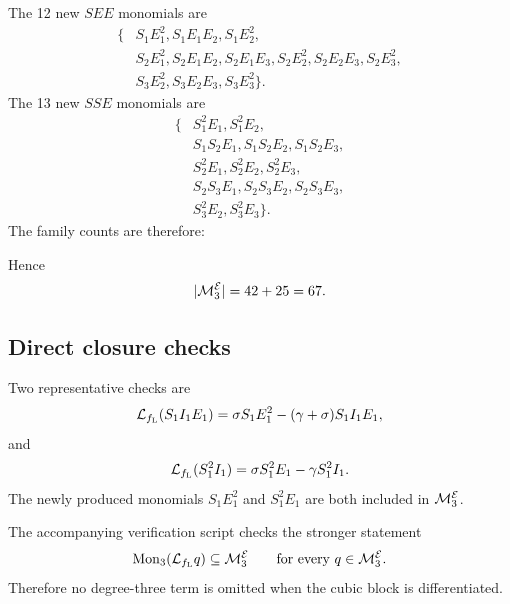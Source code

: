 The 12 new $SEE$ monomials are
\[
\begin{aligned}
\{&S_1E_1^2,S_1E_1E_2,S_1E_2^2,\\
  &S_2E_1^2,S_2E_1E_2,S_2E_1E_3,
   S_2E_2^2,S_2E_2E_3,S_2E_3^2,\\
  &S_3E_2^2,S_3E_2E_3,S_3E_3^2\}.
\end{aligned}
\]
The 13 new $SSE$ monomials are
\[
\begin{aligned}
\{&S_1^2E_1,S_1^2E_2,\\
  &S_1S_2E_1,S_1S_2E_2,S_1S_2E_3,\\
  &S_2^2E_1,S_2^2E_2,S_2^2E_3,\\
  &S_2S_3E_1,S_2S_3E_2,S_2S_3E_3,\\
  &S_3^2E_2,S_3^2E_3\}.
\end{aligned}
\]
The family counts are therefore:



Hence
\[
|\mathcal M_3^{\mathcal{E}}|
=
42+25
=
67.
\]

\subsection{Direct closure checks}

Two representative checks are
\[
\mathcal{L}_{f_{\mathrm L}}(S_1I_1E_1)
=
\sigma S_1E_1^2-(\gamma+\sigma)S_1I_1E_1,
\]
and
\[
\mathcal{L}_{f_{\mathrm L}}(S_1^2I_1)
=
\sigma S_1^2E_1-\gamma S_1^2I_1.
\]
The newly produced monomials $S_1E_1^2$ and $S_1^2E_1$ are both included in
$\mathcal M_3^{\mathcal{E}}$.

The accompanying verification script checks the stronger statement
\[
\operatorname{Mon}_3(\mathcal{L}_{f_{\mathrm L}} q)\subseteq\mathcal M_3^{\mathcal{E}}
\qquad
\text{for every }q\in\mathcal M_3^{\mathcal{E}}.
\]
Therefore no degree-three term is omitted when the cubic block is
differentiated.

